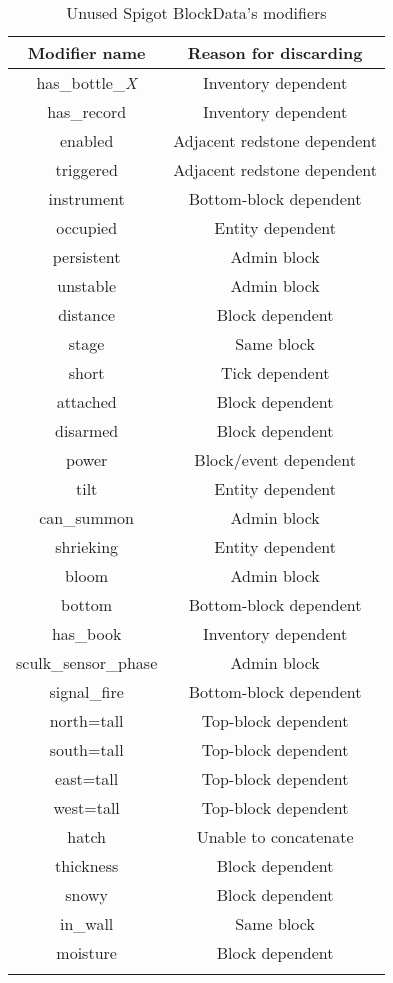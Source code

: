 \begin{longtable}{ |c|c| }
	\hline
	Modifier name & Reason for discarding \\
	\hline
	\endhead
	has\_bottle\_\textit{X} & Inventory dependent \\
	has\_record & Inventory dependent \\
	enabled & Adjacent redstone dependent \\
	triggered & Adjacent redstone dependent \\
	instrument & Bottom-block dependent \\
	occupied & Entity dependent \\
	persistent & Admin block \\
	unstable & Admin block \\
	distance & Block dependent \\
	stage & Same block \\
	short & Tick dependent \\
	attached & Block dependent \\
	disarmed & Block dependent \\
	power & Block/event dependent \\
	tilt & Entity dependent \\
	can\_summon & Admin block \\
	shrieking & Entity dependent \\
	bloom & Admin block \\
	bottom & Bottom-block dependent \\
	has\_book & Inventory dependent \\
	sculk\_sensor\_phase & Admin block \\
	signal\_fire & Bottom-block dependent \\
	north=tall & Top-block dependent \\
	south=tall & Top-block dependent \\
	east=tall & Top-block dependent \\
	west=tall & Top-block dependent \\
	hatch & Unable to concatenate \\
	thickness & Block dependent \\
	snowy & Block dependent \\
	in\_wall & Same block \\
	moisture & Block dependent \\
	\hline
	
	\caption{Unused Spigot BlockData's modifiers}
	\label{fig:unused-blockdata}
\end{longtable}

